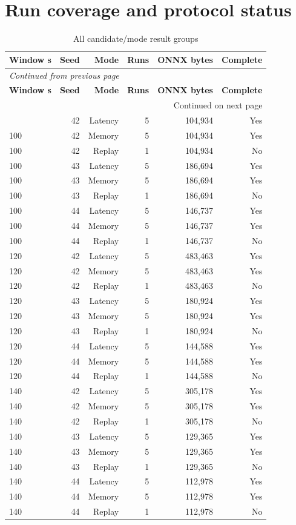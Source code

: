 \documentclass[10pt,a4paper]{article}
\begin{document}
\section{Run coverage and protocol status}
\begingroup\small\setlength{\tabcolsep}{4pt}\renewcommand{\arraystretch}{1.12}
\begin{longtable}{@{}lrrrrr@{}}
\caption{All candidate/\allowbreak{}mode result groups}\\
\toprule
\textbf{Window s} & \textbf{Seed} & \textbf{Mode} & \textbf{Runs} & \textbf{ONNX bytes} & \textbf{Complete} \\
\midrule\endfirsthead
\multicolumn{6}{l}{\small\itshape Continued from previous page}\\
\toprule
\textbf{Window s} & \textbf{Seed} & \textbf{Mode} & \textbf{Runs} & \textbf{ONNX bytes} & \textbf{Complete} \\
\midrule\endhead
\midrule\multicolumn{6}{r}{\small Continued on next page}\\\endfoot
\bottomrule\endlastfoot
100 & 42 & Latency & 5 & 104,934 & Yes \\
100 & 42 & Memory & 5 & 104,934 & Yes \\
100 & 42 & Replay & 1 & 104,934 & No \\
100 & 43 & Latency & 5 & 186,694 & Yes \\
100 & 43 & Memory & 5 & 186,694 & Yes \\
100 & 43 & Replay & 1 & 186,694 & No \\
100 & 44 & Latency & 5 & 146,737 & Yes \\
100 & 44 & Memory & 5 & 146,737 & Yes \\
100 & 44 & Replay & 1 & 146,737 & No \\
120 & 42 & Latency & 5 & 483,463 & Yes \\
120 & 42 & Memory & 5 & 483,463 & Yes \\
120 & 42 & Replay & 1 & 483,463 & No \\
120 & 43 & Latency & 5 & 180,924 & Yes \\
120 & 43 & Memory & 5 & 180,924 & Yes \\
120 & 43 & Replay & 1 & 180,924 & No \\
120 & 44 & Latency & 5 & 144,588 & Yes \\
120 & 44 & Memory & 5 & 144,588 & Yes \\
120 & 44 & Replay & 1 & 144,588 & No \\
140 & 42 & Latency & 5 & 305,178 & Yes \\
140 & 42 & Memory & 5 & 305,178 & Yes \\
140 & 42 & Replay & 1 & 305,178 & No \\
140 & 43 & Latency & 5 & 129,365 & Yes \\
140 & 43 & Memory & 5 & 129,365 & Yes \\
140 & 43 & Replay & 1 & 129,365 & No \\
140 & 44 & Latency & 5 & 112,978 & Yes \\
140 & 44 & Memory & 5 & 112,978 & Yes \\
140 & 44 & Replay & 1 & 112,978 & No \\
\end{longtable}\endgroup
\end{document}
